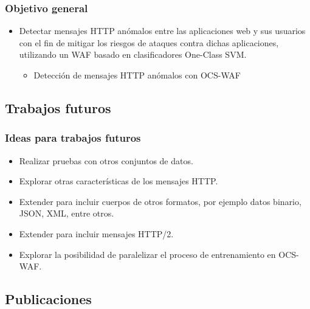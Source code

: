 \begin{frame}
    \frametitle{Objetivo general}

    \begin{itemize}[<+(1)->]
        \item
        Detectar mensajes HTTP anómalos entre las aplicaciones web y
        sus usuarios con el fin de mitigar los riesgos de ataques contra
        dichas aplicaciones, utilizando un WAF basado en clasificadores
        One-Class SVM.

        \begin{itemize}[<.->]
            \item
            Detección de mensajes HTTP anómalos con OCS-WAF
        \end{itemize}
    \end{itemize}
\end{frame}



\subsection{Trabajos futuros}

\begin{frame}
    \frametitle{Ideas para trabajos futuros}

    \begin{itemize}[<+(1)->]
        \item
        Realizar pruebas con otros conjuntos de datos.

        \item
        Explorar otras características de los mensajes HTTP.

        \item
        Extender para incluir cuerpos de otros formatos, por ejemplo
        datos binario, JSON, XML, entre otros.

        \item
        Extender para incluir mensajes HTTP/2.

        \item
        Explorar la posibilidad de paralelizar el proceso de entrenamiento
        en OCS-WAF.
    \end{itemize}
\end{frame}



\subsection{Publicaciones}

